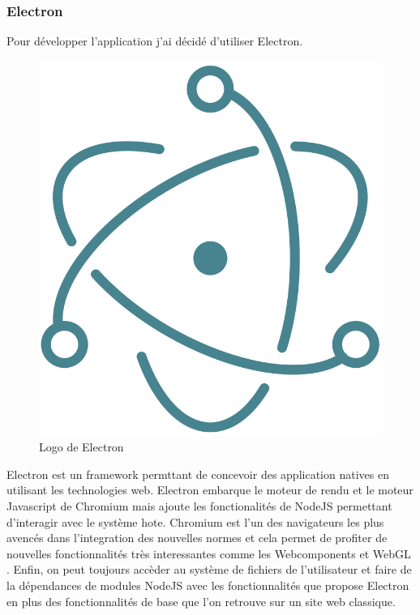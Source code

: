 \subsubsection{Electron}

Pour développer l'application j'ai décidé d'utiliser Electron.

\begin{figure}[h]
    \centering
    \includegraphics[scale=0.2]{img/electron.png}
    \caption{Logo de Electron}
\end{figure}

Electron est un framework permttant de concevoir des application natives en utilisant les technologies web.
Electron embarque le moteur de rendu et le moteur Javascript de Chromium mais ajoute les fonctionalités de NodeJS permettant d'interagir avec le système hote.
Chromium est l'un des navigateurs les plus avencés dans l'integration des nouvelles normes et cela permet de profiter de nouvelles fonctionnalités très interessantes comme les Webcomponents et WebGL .
Enfin, on peut toujours accèder au système de fichiers de l'utilisateur et faire de la dépendances de modules NodeJS avec les fonctionnalités que propose Electron en plus des fonctionnalités de base que l'on retrouve sur un site web classique.

